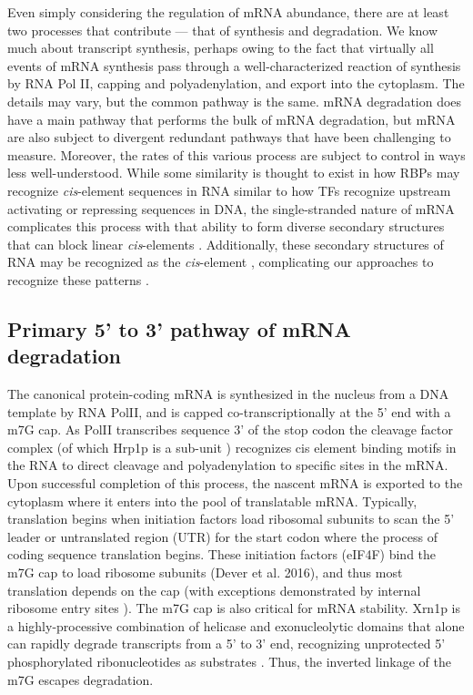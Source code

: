 Even simply considering the regulation of mRNA
abundance, there are at least two processes that contribute --- that
of synthesis and degradation. We know much about transcript synthesis,
perhaps owing to the fact that virtually all events of mRNA synthesis
pass through a well-characterized reaction of synthesis by RNA Pol II,
capping and polyadenylation, and export into the cytoplasm. The
details may vary, but the common pathway is the same. mRNA
degradation does have a main pathway that performs the bulk of mRNA
degradation, but mRNA are also subject to divergent redundant pathways
that have been challenging to measure. Moreover, the rates of this
various process are subject to control in ways less well-understood.
While some similarity is thought to exist in how RBPs may recognize
\textit{cis}-element sequences in RNA similar to how TFs recognize 
upstream
activating or repressing sequences in DNA, the single-stranded
nature of mRNA complicates this process with that ability to form
diverse secondary structures that can block linear 
\textit{cis}-elements \parencite{li2010predicting}.
Additionally, these secondary
structures of RNA may be recognized as the \textit{cis}-element
\parencite{aviv2003rna,she2017comprehensive}, 
complicating our approaches to recognize these patterns
\parencite{goodarzi2012systematic}.

\subsection{Primary 5' to 3' pathway of mRNA degradation}

The canonical protein-coding mRNA
is synthesized in the nucleus from a DNA template by RNA PolII, and
is capped co-transcriptionally at the 5' end with a m7G cap. As PolII
transcribes sequence 3' of the stop codon the cleavage factor complex
(of which Hrp1p is a sub-unit \parencite{chen1998specific})
recognizes cis element binding motifs in the RNA to direct cleavage
and polyadenylation to specific sites in the mRNA. Upon successful
completion of this process, the nascent mRNA is exported to the
cytoplasm where it enters into the pool of translatable mRNA.
Typically, translation begins when initiation factors load ribosomal
subunits to scan the 5' leader or untranslated region (UTR) for the
start codon where the process of coding sequence translation begins.
These initiation factors (eIF4F) bind the m7G cap to load ribosome
subunits (Dever et al. 2016), and thus most translation depends on the
cap (with exceptions demonstrated by internal ribosome entry sites
\parencite{gilbert2007cap}).
The m7G cap is also critical for mRNA
stability. Xrn1p is a highly-processive combination of helicase and
exonucleolytic domains that alone can rapidly degrade
transcripts from a 5' to 3' end, recognizing unprotected 5'
phosphorylated ribonucleotides as substrates \parencite{parker2012rna}. 
Thus, the inverted linkage of the m7G escapes degradation.  

